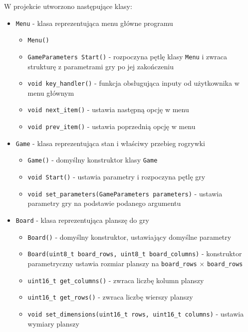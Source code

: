 \documentclass{article}
\begin{document}
W projekcie utworzono następujące klasy:
\begin{itemize}
    \item \texttt{Menu} - klasa reprezentująca menu główne programu
        \begin{itemize}
            \item \texttt{Menu()}
            \item \texttt{GameParameters Start()} - rozpoczyna pętlę klasy \texttt{Menu} i zwraca strukturę z parametrami gry po jej zakończeniu
            \item \texttt{void key\_handler()} - funkcja obsługująca inputy od użytkownika w menu głównym
            \item \texttt{void next\_item()} - ustawia następną opcję w menu
            \item \texttt{void prev\_item()} - ustawia poprzednią opcję w menu
        \end{itemize}

    \item \texttt{Game} - klasa reprezentująca stan i właściwy przebieg rogrywki
        \begin{itemize}
            \item \texttt{Game()} - domyślny konstruktor klasy \texttt{Game}
            \item \texttt{void Start()} - ustawia parametry i rozpoczyna pętlę gry
            \item \texttt{void set\_parameters(GameParameters parameters)} - ustawia parametry gry na podstawie podanego argumentu
        \end{itemize}

    \item \texttt{Board} - klasa reprezentująca planszę do gry
        \begin{itemize}
            \item \texttt{Board()} - domyślny konstruktor, ustawiający domyślne parametry
            \item \texttt{Board(uint8\_t board\_rows, uint8\_t board\_columns)} - konstruktor parametryczny ustawia rozmiar planszy na \texttt{board\_rows} $\times$ \texttt{board\_rows}
            \item \texttt{uint16\_t get\_columns()} - zwraca liczbę kolumn planszy
            \item \texttt{uint16\_t get\_rows()} - zwraca liczbę wierszy planszy
            \item \texttt{void set\_dimensions(uint16\_t rows, uint16\_t columns)} - ustawia wymiary planszy
        \end{itemize}
\end{itemize}
     
\end{document}
